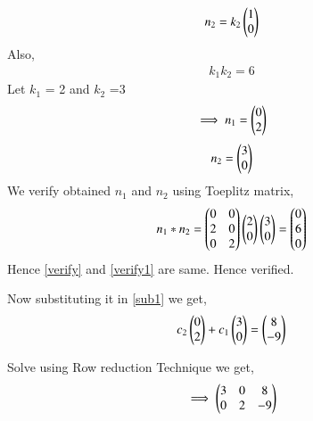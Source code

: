 \documentclass[journal,12pt,twocolumn]{IEEEtran}
\begin{document}
\begin{align}
n_2 = k_2\begin{pmatrix}1\\0\end{pmatrix}
\end{align}
Also,
\begin{align}
k_1k_2 = 6
\end{align}
Let $k_1$ = 2 and $k_2$ =3
\begin{align}
\implies n_1 = \begin{pmatrix}0\\2\end{pmatrix}
\label{n1}
\end{align}
\begin{align}
n_2 = \begin{pmatrix}3\\0\end{pmatrix}
\label{n2}
\end{align}
We verify obtained $n_1$ and $n_2$ using Toeplitz matrix,
\begin{align}
n_1*n_2 = \begin{pmatrix}0&0\\2 &0\\0&2\end{pmatrix}\begin{pmatrix}2\\0\end{pmatrix}\begin{pmatrix}3\\0\end{pmatrix} = \begin{pmatrix}0\\6\\0\end{pmatrix}
\label{verify1}
\end{align}
Hence \eqref{verify} and \eqref{verify1} are same. Hence verified. 

Now substituting it in \eqref{sub1} we get,
\begin{align}
c_2\begin{pmatrix}0\\2\end{pmatrix}+c_1\begin{pmatrix}3\\0\end{pmatrix} = \begin{pmatrix}8\\-9\end{pmatrix}
\end{align}

Solve using Row reduction Technique we get,
\begin{align}
\implies\begin{pmatrix}3&0&8\\0&2&-9\end{pmatrix} 
\end{align}
\end{document}
